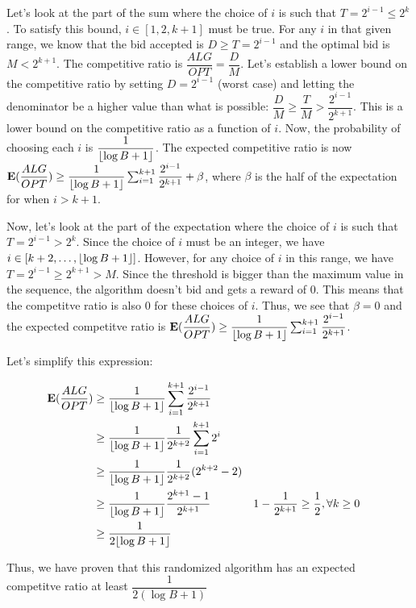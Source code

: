 \documentclass{article}
\DeclarePairedDelimiter\floor{\lfloor}{\rfloor}
\begin{document}
Let's look at the part of the sum where the choice of $i$ is such that $T = 2^{i-1} \leq 2^{k}$. To satisfy this bound,
$i \in [1, 2, k + 1]$ must be true. For any $i$ in that given range, we know that the bid accepted is $D \geq T = 2^{i - 1}$ and the
optimal bid is $M < 2^{k + 1}$. The competitive ratio is $\dfrac{ALG}{OPT} = \dfrac{D}{M}$. Let's establish a lower bound on the
competitive ratio by setting $D = 2^{i - 1}$ (worst case) and letting the denominator be a higher value than what is possible:
$\dfrac{D}{M} \geq \dfrac{T}{M}  > \dfrac{2^{i - 1}}{2^{k + 1}}$. This is a lower bound on the competitive ratio as a
function of $i$. Now, the probability of choosing each $i$ is $\dfrac{1}{\floor{\log B + 1}}$. The expected competitive
ratio is now $\mathbf{E}(\dfrac{ALG}{OPT}) \geq \dfrac{1}{\floor{\log B + 1}} \sum_{i = 1}^{k + 1} \dfrac{2^{i - 1}}{2^{k +
1}} + \beta$, where $\beta$ is the half of the expectation for when $i > k + 1$.

Now, let's look at the part of the expectation where the choice of $i$ is such that $T = 2^{i - 1} > 2^{k}$. Since the
choice of $i$ must be an integer, we have $i \in [k + 2, \ldots, \floor{\log B + 1}]$. However, for any choice of $i$ in
this range, we have $T = 2^{i - 1} \geq 2^{k + 1} > M$. Since the threshold is bigger than the maximum value in the
sequence, the algorithm doesn't bid and gets a reward of 0. This means that the competitve ratio is also 0 for these
choices of $i$. Thus, we see that $\beta = 0$ and the expected competitve ratio is $\mathbf{E}(\dfrac{ALG}{OPT}) \geq
\dfrac{1}{\floor{\log B + 1}} \sum_{i = 1}^{k + 1} \dfrac{2^{i - 1}}{2^{k + 1}}$.

Let's simplify this expression:

\begin{align*}
    \mathbf{E}(\dfrac{ALG}{OPT}) &\geq \dfrac{1}{\floor{\log B + 1}} \sum_{i = 1}^{k + 1} \dfrac{2^{i - 1}}{2^{k +1 }} \\
    &\geq \dfrac{1}{\floor{\log B + 1}} \dfrac{1}{2^{k + 2}} \sum_{i = 1}^{k + 1} 2^i \\
    &\geq \dfrac{1}{\floor{\log B + 1}} \dfrac{1}{2^{k + 2}} (2^{k + 2} - 2)\\
    &\geq \dfrac{1}{\floor{\log B + 1}} \dfrac{2^{k + 1} - 1}{2^{k + 1}} && \text{$1 - \dfrac{1}{2^{k +1}} \geq
        \dfrac{1}{2}, \forall k \geq 0$} \\
    &\geq \dfrac{1}{2\floor{\log B + 1}}
\end{align*}


Thus, we have proven that this randomized algorithm has an expected competitve ratio at least $\dfrac{1}{2 (\log B + 1)}$
\end{document}
